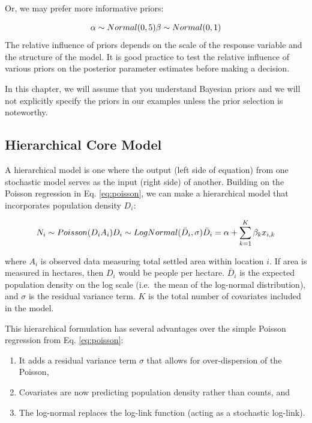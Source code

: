 \documentclass[]{book}
\providecommand{\tightlist}{%
  \setlength{\itemsep}{0pt}\setlength{\parskip}{0pt}}
\begin{document}
Or, we may prefer more informative priors:

\[
\alpha \sim Normal(0, 5) \\
\beta \sim Normal(0, 1) 
\] The relative influence of priors depends on the scale of the response
variable and the structure of the model. It is good practice to test the
relative influence of various priors on the posterior parameter
estimates before making a decision.

In this chapter, we will assume that you understand Bayesian priors and
we will not explicitly specify the priors in our examples unless the
prior selection is noteworthy.

\subsection{Hierarchical Core Model}\label{hierarchical-core-model}

A hierarchical model is one where the output (left side of equation)
from one stochastic model serves as the input (right side) of another.
Building on the Poisson regression in Eq. \eqref{eq:poisson}, we can make
a hierarchical model that incorporates population density \(D_i\):

\begin{equation}
  N_i \sim Poisson( D_i A_i ) \\
  D_i \sim LogNormal( \bar{D}_i, \sigma) \\
  \bar{D}_i = \alpha + \sum_{k=1}^{K} \beta_k x_{i,k}
  \label{eq:likelihood}
\end{equation}

where \(A_i\) is observed data measuring total settled area within
location \(i\). If area is measured in hectares, then \(D_i\) would be
people per hectare. \(\bar{D}_i\) is the expected population density on
the log scale (i.e.~the mean of the log-normal distribution), and
\(\sigma\) is the residual variance term. \(K\) is the total number of
covariates included in the model.

This hierarchical formulation has several advantages over the simple
Poisson regression from Eq. \eqref{eq:poisson}:

\begin{enumerate}
\def\labelenumi{\arabic{enumi}.}
\tightlist
\item
  It adds a residual variance term \(\sigma\) that allows for
  over-dispersion of the Poisson,\\
\item
  Covariates are now predicting population density rather than counts,
  and\\
\item
  The log-normal replaces the log-link function (acting as a stochastic
  log-link).
\end{enumerate}
\end{document}

